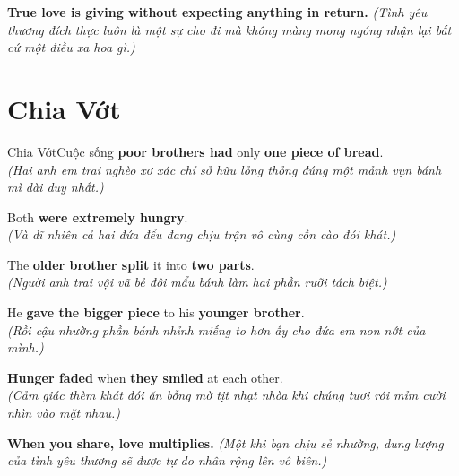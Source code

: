 \begin{baihoc}
  \textbf{True love is giving without expecting anything in return.} \textit{(Tình yêu thương đích thực luôn là một sự cho đi mà không màng mong ngóng nhận lại bất cứ một điều xa hoa gì.)}
\end{baihoc}

\vspace{0.8cm}

\ngayDay{}
\section{Chia Vớt}
\begin{truyen}{Chia Vớt}{Cuộc sống}
 \textbf{poor brothers had} only \textbf{one piece of bread}.\\
\textit{(Hai anh em trai nghèo xơ xác chỉ sở hữu lỏng thỏng đúng một mảnh vụn bánh mì dài duy nhất.)}

Both \textbf{were extremely hungry}.\\
\textit{(Và dĩ nhiên cả hai đứa đểu đang chịu trận vô cùng cồn cào đói khát.)}

The \textbf{older brother split} it into \textbf{two parts}.\\
\textit{(Người anh trai vội vã bẻ đôi mẩu bánh làm hai phần rưỡi tách biệt.)}

He \textbf{gave the bigger piece} to his \textbf{younger brother}.\\
\textit{(Rồi cậu nhường phần bánh nhỉnh miếng to hơn ấy cho đứa em non nớt của mình.)}

\textbf{Hunger faded} when \textbf{they smiled} at each other.\\
\textit{(Cảm giác thèm khát đói ăn bỗng mờ tịt nhạt nhòa khi chúng tươi rói mỉm cười nhìn vào mặt nhau.)}
\end{truyen}

\begin{baihoc}
  \textbf{When you share, love multiplies.} \textit{(Một khi bạn chịu sẻ nhường, dung lượng của tình yêu thương sẽ được tự do nhân rộng lên vô biên.)}
\end{baihoc}

\vspace{0.8cm}

\ngayDay{}
